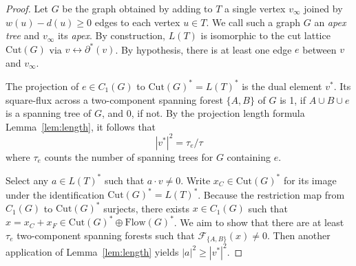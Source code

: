 \documentclass[11pt]{amsart}
\numberwithin{equation}{section}
\def\cF{{\mathcal F}}
\def\Cut{{\mathrm{Cut}}}
\def\Flow{{\mathrm{Flow}}}
\def\Cut{{\mathrm{Cut}}}
\def\Flow{{\mathrm{Flow}}}
\def\del{{\partial}}
\newcommand{\norm}[1]{\left| #1 \right|^2}
\begin{document}
\begin{proof}
    Let $G$ be the graph obtained by adding to $T$ a single vertex $v_\infty$ joined by $w(u) - d(u) \ge 0$ edges to each vertex $u\in T$.
    We call such a graph $G$ an {\em apex tree} and $v_\infty$ its {\em apex}.
    By construction, $L(T)$ is isomorphic to the cut lattice $\Cut(G)$ via $v \longleftrightarrow \del^*(v)$.
    By hypothesis, there is at least one edge $e$ between $v$ and $v_\infty$.

    The projection of $e \in C_1(G)$ to $\Cut(G)^* = L(T)^*$ is the dual element $v^*$.
    Its square-flux across a two-component spanning forest $\{A,B\}$ of $G$ is 1, if  $A \cup B \cup e$ is a spanning tree of $G$, and 0, if not.
    By the projection length formula Lemma~\ref{lem:length}, it follows that
    \begin{equation}
        \label{e:self-pairing}
    \norm{v^*}=\tau_e/\tau
    \end{equation}
    where $\tau_e$ counts the number of spanning trees for $G$ containing $e$.

    Select any $a \in L(T)^*$ such that $a \cdot v \ne 0$.
    Write $x_C \in \Cut(G)^*$ for its image under the identification $\Cut(G)^* = L(T)^*$.
    Because the restriction map from $C_1(G)$ to $\Cut(G)^*$ surjects, there exists $x\in C_1(G)$ such that $x = x_C + x_F \in \Cut(G)^* \oplus \Flow(G)^*$.
    We aim to show that there are at least $\tau_e$ two-component spanning forests such that $\cF_{\{A,B\}}(x)\neq 0$.
    Then another application of Lemma~\ref{lem:length} yields $\norm{a} \ge \norm{v^*}$.
    

\end{proof}
\end{document}
